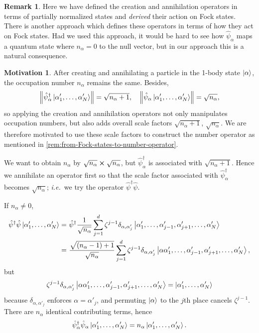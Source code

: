 \documentclass{article}
\theoremstyle{definition}
\newtheorem{mot}{Motivation}[section]
\newtheorem{rem}{Remark}[section]
\theoremstyle{plain}
\numberwithin{equation}{section}
\begin{document}
\begin{rem}
    Here we have defined 
    the creation and annihilation operators 
    in terms of partially normalized states 
    and \emph{derived} their action 
    on Fock states. There is another approach
    \cite[][\S\ 2.1]{altland_condensed_2023}
    which 
    defines these operators in terms of 
    how they act on Fock states. 
    Had we used this approach, 
    it would be hard to see how 
    $\hat{\psi}_{\alpha}$ maps 
    a quantum state where $n_{\alpha}=0$ 
    to the null vector, 
    but in our approach this is a 
    natural consequence.
\end{rem}

\begin{mot}
    After creating and annihilating 
    a particle in the 1-body state $\ket{\alpha}$, 
    the occupation number $n_{\alpha}$ 
    remains the same. Besides, 
    \[
        \norm{
        \hat{\psi}^{\dagger}_{\alpha}
        \ket{\alpha'_{1}, \ldots ,\alpha'_{N}}
        }
        =
        \sqrt{n_{\alpha}+1},\quad
        \norm{
        \hat{\psi}_{\alpha}
        \ket{\alpha'_{1}, \ldots ,\alpha'_{N}}
        }
        =
        \sqrt{n_{\alpha}},
    \]
    so applying the creation and annihilation 
    operators 
    not only manipulates occupation numbers, 
    but also adds overall scale factors 
    $\sqrt{n_{\alpha}+1}$, $\sqrt{n_{\alpha}}$. 
    We are therefore motivated 
    to use these scale factors 
    to construct the number operator 
    as mentioned in \cref{rem:from-Fock-states-to-number-operator}.
\end{mot}

We want to obtain $n_{\alpha}$ by 
$\sqrt{n_{\alpha}}\cross \sqrt{n_{\alpha}}$, 
but $\hat{\psi}^{\dagger}_{\alpha}$ 
is associated with $\sqrt{n_{\alpha}+1}$. 
Hence we annihilate an operator first so that 
the scale factor associated with $\hat{\psi}^{\dagger}_{\alpha}$ 
becomes $\sqrt{n_{\alpha}}$; \textit{i.e.}\ we try 
the operator $\hat{\psi}^{\dagger}\hat{\psi}$.

If $n_{\alpha}\neq 0$, 
\begin{align*}
    \hat{\psi}^{\dagger}\hat{\psi}
    \ket{\alpha'_{1}, \ldots ,\alpha'_{N}}
    =&\ 
    \hat{\psi}^{\dagger}
    \frac{1}{\sqrt{n_{\alpha}}}
    \sum_{j=1}^{d}
    \zeta^{j-1}\delta_{\alpha,\alpha'_{j}}
    \ket{\alpha'_{1}, \ldots ,\alpha'_{j-1},
    \alpha'_{j+1}, \ldots ,\alpha'_{N}} \\
    =&\ 
    \frac{\sqrt{(n_{\alpha}-1)+1}}{\sqrt{n_{\alpha}}}
    \sum_{j=1}^{d}
    \zeta^{j-1}\delta_{\alpha,\alpha'_{j}}
    \ket{\alpha \alpha'_{1}, \ldots ,\alpha'_{j-1},
    \alpha'_{j+1}, \ldots ,\alpha'_{N}},
\end{align*}
but 
\[
    \zeta^{j-1}\delta_{\alpha,\alpha'_{j}}
    \ket{\alpha \alpha'_{1}, \ldots ,\alpha'_{j-1},
    \alpha'_{j+1}, \ldots ,\alpha'_{N}}
    =
    \ket{\alpha'_{1}, \ldots ,\alpha'_{N}}
\]
because $\delta_{\alpha,\alpha'_{j}}$ 
enforces 
$\alpha=\alpha'_{j}$, 
and permuting $\ket{\alpha}$ to the $j$th place 
cancels $\zeta^{j-1}$. 
There are $n_{\alpha}$ identical contributing terms, hence
\[
    \hat{\psi}^{\dagger}_{\alpha}\hat{\psi}_{\alpha}
    \ket{\alpha'_{1}, \ldots ,\alpha'_{N}}
    =
    n_{\alpha}
    \ket{\alpha'_{1}, \ldots ,\alpha'_{N}}.
\]
\end{document}
